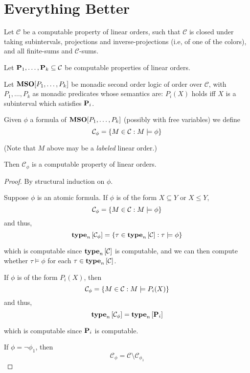 \section{Everything Better}

\begin{theorem}
    Let $\mathcal{C}$ be a computable property of linear orders,
    such that $\mathcal{C}$ is closed under taking subintervals,
    projections and inverse-projections (i.e, of one of the colors), and all finite-sums and $\mathcal{C}$-sums.

    Let $\mathbf{P}_1, \ldots, \mathbf{P}_k \subseteq \mathcal{C}$ be
    computable properties of linear orders.

    Let $\mathbf{MSO}[P_1, \ldots, P_k]$ be monadic second order logic of order
    over $\mathcal{C}$,
    with $P_1, \ldots, P_k$ as monadic predicates whose semantics are:
    $P_i(X)$ holds iff $X$ is a subinterval which satisfies $\mathbf{P}_i$.

    Given $\phi$ a formula of $\mathbf{MSO}[P_1, \ldots, P_k]$ (possibly with free variables)
    we define \[ \mathcal{C}_{\phi} = \left\{ {M \in \mathcal{C} : M \models \phi} \right\} \]

    (Note that $M$ above may be a \emph{labeled} linear order.)

    Then $\mathcal{C}_{\phi}$ is a computable property of linear orders.
\end{theorem}

\begin{proof}
    By structural induction on $\phi$.

    Suppose $\phi$ is an atomic formula.
    If $\phi$ is of the form $X \subseteq Y$ or $X \le Y$,
    \[
        \mathcal{C}_{\phi} = \left\{ {M \in \mathcal{C} : M \models \phi} \right\}
    \]
    and thus,
    \[
        \mathbf{type}_{n} \left[ {\mathcal{C}_{\phi}} \right] = \left\{ {\tau \in \mathbf{type}_{n} \left[ {\mathcal{C}} \right] : \tau \models \phi} \right\}
    \]

    which is computable since $\mathbf{type}_{n} \left[ {\mathcal{C}} \right]$ is computable,
    and we can then compute whether $\tau \models \phi$ for each $\tau \in \mathbf{type}_{n} \left[ {\mathcal{C}} \right]$.

    If $\phi$ is of the form $P_i(X)$,
    then
    \[
        \mathcal{C}_{\phi} = \left\{ {M \in \mathcal{C} : M \models P_i(X)} \right\}
    \]
    and thus,
    \[
        \mathbf{type}_{n} \left[ {\mathcal{C}_{\phi}} \right] = \mathbf{type}_{n} \left[ {\mathbf{P}_i} \right]
    \]

    which is computable since $\mathbf{P}_i$ is computable.

    If $\phi = \neg \phi_1$,
    then
    \[
        \mathcal{C}_{\phi} = \mathcal{C} \setminus \mathcal{C}_{\phi_1}
    \]

\end{proof}